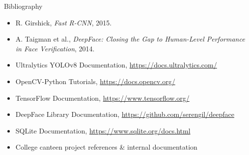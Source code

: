 \documentclass[10pt]{beamer}
\begin{document}
\begin{frame}{Bibliography}
    \begin{itemize}
        \item R. Girshick, \textit{Fast R-CNN}, 2015.
        \item A. Taigman et al., \textit{DeepFace: Closing the Gap to Human-Level Performance in Face Verification}, 2014.
        \item Ultralytics YOLOv8 Documentation, \url{https://docs.ultralytics.com/}
        \item OpenCV-Python Tutorials, \url{https://docs.opencv.org/}
        \item TensorFlow Documentation, \url{https://www.tensorflow.org/}
        \item DeepFace Library Documentation, \url{https://github.com/serengil/deepface}
        \item SQLite Documentation, \url{https://www.sqlite.org/docs.html}
        \item College canteen project references & internal documentation
    \end{itemize}
\end{frame}
\end{document}
